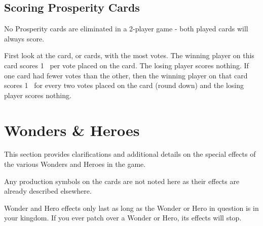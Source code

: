 \documentclass[10pt,twocolumn]{article}
\begin{document}
\begin{appendices}
\subsection{Scoring Prosperity Cards}
No Prosperity cards are eliminated in a 2-player game - both played cards will always score.

First look at the card, or cards, with the most votes. The winning player on this card scores 1 \vp\ per vote placed on the card. The losing player scores nothing. If one card had fewer votes than the other, then the winning player on that card scores 1 \vp\ for every two votes placed on the card (round down) and the losing player scores nothing.
\section{Wonders \& Heroes}
This section provides clarifications and additional details on the special effects of the various Wonders and Heroes in the game.

Any production symbols on the cards are not noted here as their effects are already described elsewhere.

Wonder and Hero effects only last as long as the Wonder or Hero in question is in your kingdom. If you ever patch over a Wonder or Hero, its effects will stop.

\end{appendices}
\end{document}
